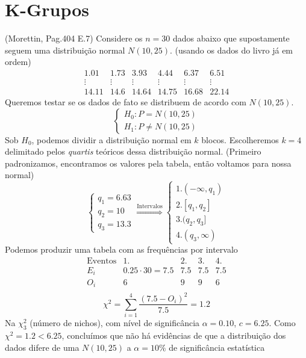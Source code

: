 \documentclass[
  letterpaper,
  DIV=11,
  numbers=noendperiod]{scrreprt}
\begin{document}
\section{K-Grupos}\label{k-grupos}

(Morettin, Pag.404 E.7) Considere os \(n=30\) dados abaixo que
supostamente seguem uma distribuição normal \(N(10,25)\). (usando os
dados do livro já em ordem) \[
\begin{array}{}
1.01 & 1.73 & 3.93 & 4.44 & 6.37 & 6.51 \\ 
\vdots  & \vdots  & \vdots & \vdots  & \vdots & \vdots \\
14.11 & 14.6 & 14.64 & 14.75 & 16.68 & 22.14
\end{array}
\] Queremos testar se os dados de fato se distribuem de acordo com
\(N(10,25)\). \[
\begin{cases}
H_{0}:P=N(10,25) \\
H_{1}:P\neq N(10,25)
\end{cases}
\] Sob \(H_{0}\), podemos dividir a distribuição normal em \(k\) blocos.
Escolheremos \(k=4\) delimitado pelos \emph{quartis} teóricos dessa
distribuição normal. (Primeiro padronizamos, encontramos os valores pela
tabela, então voltamos para nossa normal) \[
\begin{cases}
q_{1} = 6.63 \\
q_{2} = 10 \\
q_{3} = 13.3
\end{cases} \stackrel{\mathrm{Intervalos}}{\Rightarrow}
\begin{cases}
1.(-\infty, q_{1}) \\
2.[q_{1},q_{2}] \\
3.(q_{2},q_{3}] \\
4.(q_{3},\infty)
\end{cases}
\] Podemos produzir uma tabela com as frequências por intervalo \[
\begin{array}{c|cc}
\mathrm{Eventos}  &  1.  & 2. & 3. & 4.\\
\hline
E_{i} & 0.25 \cdot 30=7.5  & 7.5 & 7.5 & 7.5 \\
O_{i} & 6  & 9 & 9 & 6 \\
\end{array}
\] \[
\chi^2 = \sum^4_{i=1} \frac{(7.5 - O_{i})^2}{7.5} = 1.2
\] Na \(\chi^2_{3}\) (número de nichos), com nível de significância
\(\alpha=0.10\), \(c = 6.25\). Como \(\chi^2=1.2<6.25\), concluímos que
não há evidências de que a distribuição dos dados difere de uma
\(N(10,25)\) a \(\alpha=10\%\) de significância estatística
\end{document}
